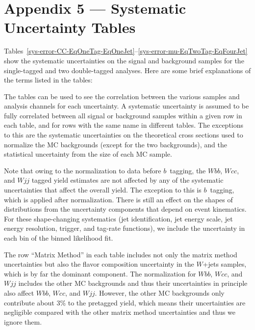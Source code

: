 %
\appendix
\section*{Appendix 5 --- Systematic Uncertainty Tables}
\label{appendix-systematics}


Tables~\ref{sys-error-CC-EqOneTag-EqOneJet}--\ref{sys-error-mu-EqTwoTag-EqFourJet}
show the systematic uncertainties on the signal and background samples
for the single-tagged and two double-tagged analyses. Here are some
brief explanations of the terms listed in the tables:


The tables can be used to see the correlation between the various
samples and analysis channels for each uncertainty. A systematic
uncertainty is assumed to be fully correlated between all signal or
background samples within a given row in each table, and for rows with
the same name in different tables. The exceptions to this are the
systematic uncertainties on the theoretical cross sections used to
normalize the MC backgrounds (except for the two {\ttbar}
backgrounds), and the statistical uncertainty from the size of each MC
sample.

Note that owing to the normalization to data before $b$~tagging, the
$Wbb$, $Wcc$, and $Wjj$ tagged yield estimates are not affected by any of the
systematic uncertainties that affect the overall yield. The exception
to this is $b$~tagging, which is applied after normalization.  There
is still an effect on the shapes of distributions from the uncertainty
components that depend on event kinematics. For these shape-changing
systematics (jet identification, jet energy scale, jet energy
resolution, trigger, and tag-rate functions), we include the
uncertainty in each bin of the binned likelihood fit.

The row ``Matrix Method'' in each table includes not only the matrix method
uncertainties but also the flavor composition uncertainty in the $W$+jets samples,
which is by far the dominant component.
The normalization for $Wbb$, $Wcc$, and $Wjj$ includes the
other MC backgrounds and thus their uncertainties in principle also
affect $Wbb$, $Wcc$, and $Wjj$.  However, the other MC backgrounds only
contribute about 3\% to the pretagged yield, which means their
uncertainties are negligible compared with the other matrix method
uncertainties and thus we ignore them.

